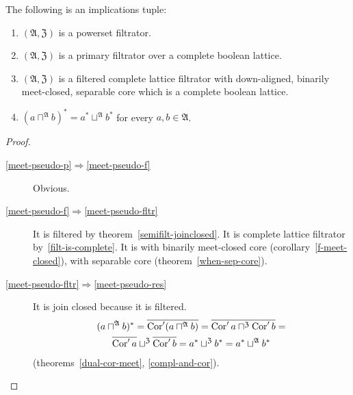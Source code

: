 \begin{thm}
The following is an implications tuple:
\begin{enumerate}
\item \label{meet-pseudo-p}$(\mathfrak{A},\mathfrak{Z})$ is a powerset filtrator.
\item \label{meet-pseudo-f}$(\mathfrak{A},\mathfrak{Z})$ is a primary filtrator over a complete boolean lattice.
\item \label{meet-pseudo-fltr}$(\mathfrak{A},\mathfrak{Z})$ is a filtered
complete lattice filtrator with down-aligned, binarily meet-closed,
separable core which is a complete boolean lattice.
\item \label{meet-pseudo-res}$(a\sqcap^{\mathfrak{A}}b)^{\ast}=a^{\ast}\sqcup^{\mathfrak{A}}b^{\ast}$
for every $a,b\in\mathfrak{A}$.
\end{enumerate}
\end{thm}
\begin{proof}
~
\begin{description}
\item [\ref{meet-pseudo-p}$\Rightarrow$\ref{meet-pseudo-f}] Obvious.
\item [\ref{meet-pseudo-f}$\Rightarrow$\ref{meet-pseudo-fltr}]
It is filtered by theorem~\ref{semifilt-joinclosed}. It is complete lattice filtrator by~\ref{filt-is-complete}.
It is with binarily meet-closed core (corollary~\ref{f-meet-closed}),
with separable core (theorem~\ref{when-sep-core}).
\item [\ref{meet-pseudo-fltr}$\Rightarrow$\ref{meet-pseudo-res}]
It is join closed because it is filtered.
\begin{multline*}
(a\sqcap^{\mathfrak{A}}b)^{\ast} = \overline{\operatorname{Cor}'(a\sqcap^{\mathfrak{A}}b)} =
\overline{\operatorname{Cor}'a\sqcap^{\mathfrak{Z}}\operatorname{Cor}'b} =\\
\overline{\operatorname{Cor}'a}\sqcup^{\mathfrak{Z}}\overline{\operatorname{Cor}'b} =
a^{\ast}\sqcup^{\mathfrak{Z}}b^{\ast} = a^{\ast}\sqcup^{\mathfrak{A}}b^{\ast}
\end{multline*}
(theorems~\ref{dual-cor-meet}, \ref{compl-and-cor}).
\end{description}
\end{proof}

